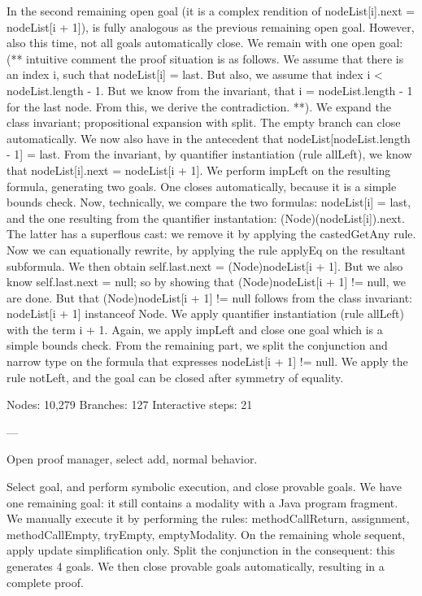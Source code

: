 \documentclass[runningheads]{llncs}
\begin{document}
In the second remaining open goal (it is a complex rendition of nodeList[i].next = nodeList[i + 1]), is fully analogous as the previous remaining open goal. However, also this time, not all goals automatically close. We remain with one open goal: (** intuitive comment the proof situation is as follows. We assume that there is an index i, such that nodeList[i] = last. But also, we assume that index i < nodeList.length - 1. But we know from the invariant, that i = nodeList.length - 1 for the last node. From this, we derive the contradiction. **). We expand the class invariant; propositional expansion with split. The empty branch can close automatically. We now also have in the antecedent that nodeList[nodeList.length - 1] = last. From the invariant, by quantifier instantiation (rule allLeft), we know that nodeList[i].next = nodeList[i + 1]. We perform impLeft on the resulting formula, generating two goals. One closes automatically, because it is a simple bounds check. Now, technically, we compare the two formulas: nodeList[i] = last, and the one resulting from the quantifier instantation: (Node)(nodeList[i]).next. The latter has a superflous cast: we remove it by applying the castedGetAny rule. Now we can equationally rewrite, by applying the rule applyEq on the resultant subformula. We then obtain self.last.next = (Node)nodeList[i + 1]. But we also know self.last.next = null; so by showing that (Node)nodeList[i + 1] != null, we are done. But that (Node)nodeList[i + 1] != null follows from the class invariant: nodeList[i + 1] instanceof Node. We apply quantifier instantiation (rule allLeft) with the term i + 1. Again, we apply impLeft and close one goal which is a simple bounds check. From the remaining part, we split the conjunction and narrow type on the formula that expresses nodeList[i + 1] != null. We apply the rule notLeft, and the goal can be closed after symmetry of equality.

Nodes: 10,279
Branches: 127
Interactive steps: 21

---

Open proof manager, select add, normal behavior.

Select goal, and perform symbolic execution, and close provable goals. We have one remaining goal: it still contains a modality with a Java program fragment. We manually execute it by performing the rules: methodCallReturn, assignment, methodCallEmpty, tryEmpty, emptyModality. On the remaining whole sequent, apply update simplification only. Split the conjunction in the consequent: this generates 4 goals. We then close provable goals automatically, resulting in a complete proof.
\end{document}
